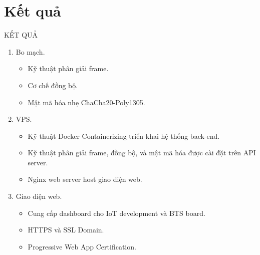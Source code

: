 \section{Kết quả}
\begin{frame}{KẾT QUẢ}
	\begin{enumerate}
		\item Bo mạch.
		\begin{itemize}
			\item Kỹ thuật phân giải frame.
			\item Cơ chế đồng bộ.
			\item Mật mã hóa nhẹ ChaCha20-Poly1305.
		\end{itemize}
		\item VPS.
		\begin{itemize}
			\item Kỹ thuật Docker Containerizing triển khai hệ thống back-end.
			\item Kỹ thuật phân giải frame, đồng bộ, và mật mã hóa được cài đặt trên API server.
			\item Nginx web server host giao diện web.
		\end{itemize}
		\item Giao diện web.
		\begin{itemize}
			\item Cung cấp dashboard cho IoT development và BTS board.
			\item HTTPS và SSL Domain.
			\item Progressive Web App Certification.
		\end{itemize}
	\end{enumerate}
\end{frame}